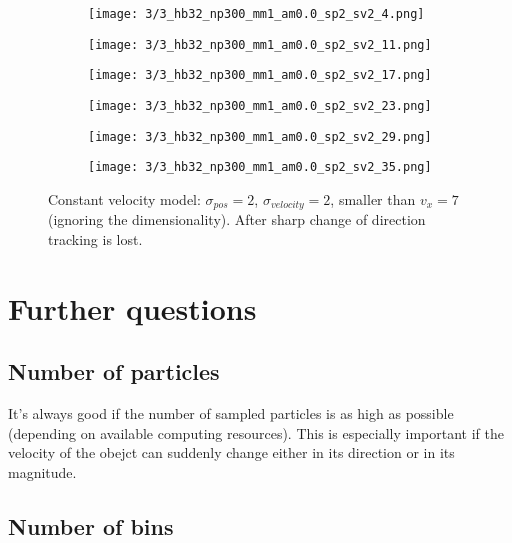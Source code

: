 \documentclass[10pt,a4paper,twoside]{article}
\newcommand{\sweepsize}{0.26}
\begin{document}
\begin{figure}[h]
    \centering
    \begin{subfigure}{\sweepsize\textwidth}
    \texttt{[image: 3/3\_hb32\_np300\_mm1\_am0.0\_sp2\_sv2\_4.png]} 
    \end{subfigure}
    \begin{subfigure}{\sweepsize\textwidth}
    \texttt{[image: 3/3\_hb32\_np300\_mm1\_am0.0\_sp2\_sv2\_11.png]} 
    \end{subfigure}
    \begin{subfigure}{\sweepsize\textwidth}
    \texttt{[image: 3/3\_hb32\_np300\_mm1\_am0.0\_sp2\_sv2\_17.png]} 
    \end{subfigure}
    \begin{subfigure}{\sweepsize\textwidth}
    \texttt{[image: 3/3\_hb32\_np300\_mm1\_am0.0\_sp2\_sv2\_23.png]} 
    \end{subfigure}
    \begin{subfigure}{\sweepsize\textwidth}
    \texttt{[image: 3/3\_hb32\_np300\_mm1\_am0.0\_sp2\_sv2\_29.png]} 
    \end{subfigure}
    \begin{subfigure}{\sweepsize\textwidth}
    \texttt{[image: 3/3\_hb32\_np300\_mm1\_am0.0\_sp2\_sv2\_35.png]} 
    \end{subfigure}
    \caption{Constant velocity model: $\sigma_{pos}=2$, $\sigma_{velocity}=2$, smaller than $v_x=7$ (ignoring the dimensionality). After sharp change of direction tracking is lost.}

\end{figure}

\newpage

\section{Further questions}
\subsection{Number of particles}

It's always good if the number of sampled particles is as high as possible
(depending on available computing resources). This is especially important if
the velocity of the obejct can suddenly change either in its direction or in its
magnitude.

\subsection{Number of bins}
\end{document}
